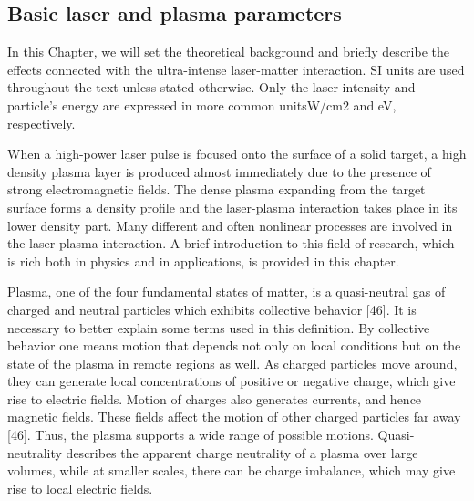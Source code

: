 \documentclass[10pt, a4paper, twoside, openright]{report}
\begin{document}
%

\subsection{Basic laser and plasma parameters}

In this Chapter, we will set the theoretical background and briefly describe the effects
connected with the ultra-intense laser-matter interaction. SI units are used throughout the
text unless stated otherwise. Only the laser intensity and particle’s energy are expressed in
more common unitsW/cm2 and eV, respectively.


When a high-power laser pulse is focused onto the surface of a solid target, a high density plasma layer is produced almost immediately due to the presence of strong electromagnetic fields. The dense plasma expanding from the target surface forms a density profile and the laser-plasma interaction takes place in its lower density part. Many different and often nonlinear processes are involved in the laser-plasma interaction. A brief introduction to this field of research, which is rich both in physics and in applications, is provided in this chapter.

Plasma, one of the four fundamental states of matter, is a quasi-neutral gas of charged and
neutral particles which exhibits collective behavior [46]. It is necessary to better explain some
terms used in this definition.
By collective behavior one means motion that depends not only on local conditions but
on the state of the plasma in remote regions as well. As charged particles move around, they
can generate local concentrations of positive or negative charge, which give rise to electric
fields. Motion of charges also generates currents, and hence magnetic fields. These fields
affect the motion of other charged particles far away [46]. Thus, the plasma supports a wide
range of possible motions.
Quasi-neutrality describes the apparent charge neutrality of a plasma over large volumes,
while at smaller scales, there can be charge imbalance, which may give rise to local electric
fields. 
\end{document}
